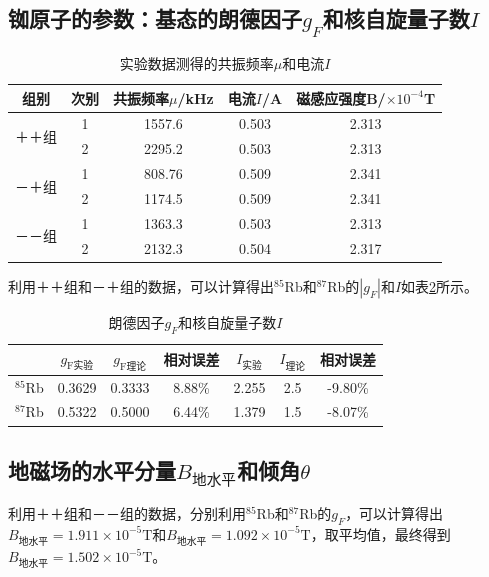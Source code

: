 \documentclass[a4paper]{article}
\begin{document}
\subsection{铷原子的参数：基态的朗德因子$g_F$和核自旋量子数$I$}
\begin{table}[]
\centering
\begin{tabular}{|c|c|c|c|c|}
\hline
组别    &次别   &共振频率$\mu$/kHz &电流$I$/A   &磁感应强度B/$\times 10^{-4}$T\\   \hline
\multirow{2}{*}{＋＋组} 
&1    &1557.6   &0.503  &2.313  \\  \cline{2-5}
&2    &2295.2   &0.503  &2.313  \\  \hline
\multirow{2}{*}{－＋组} 
&1    &808.76   &0.509  &2.341  \\  \cline{2-5}
&2    &1174.5   &0.509  &2.341  \\  \hline
\multirow{2}{*}{－－组} 
&1    &1363.3   &0.503  &2.313  \\  \cline{2-5}
&2    &2132.3   &0.504  &2.317  \\  \hline
\end{tabular}
\caption{实验数据测得的共振频率$\mu$和电流$I$}\label{table2}
\end{table}


利用＋＋组和－＋组的数据，可以计算得出$^{85}$Rb和$^{87}$Rb的$|g_F|$和$I$如表\ref{table3}所示。
\begin{table}[]
\centering
\begin{tabular}{|c|c|c|c|c|c|c|}
\hline
            &$g_\text{F实验}$    &$g_\text{F理论}$ &相对误差   &$I_\text{实验}$  &$I_\text{理论}$  &相对误差   \\\hline
$^{85}$Rb   &0.3629              &0.3333           &8.88\%     &2.255           &2.5    &-9.80\%    \\ \hline
$^{87}$Rb   &0.5322              &0.5000           &6.44\%     &1.379           &1.5    &-8.07\%    \\ \hline
\end{tabular}
\caption{朗德因子$g_F$和核自旋量子数$I$}\label{table3}
\end{table}

\subsection{地磁场的水平分量$B_{\text{地水平}}$和倾角$\theta$}
利用＋＋组和－－组的数据，分别利用$^{85}$Rb和$^{87}$Rb的$g_F$，可以计算得出$B_{\text{地水平}} = 1.911\times 10^{-5}\text{T}$和$B_{\text{地水平}} = 1.092\times 10^{-5}\text{T}$，取平均值，最终得到$B_{\text{地水平}} = 1.502\times 10^{-5}\text{T}$。
\end{document}
